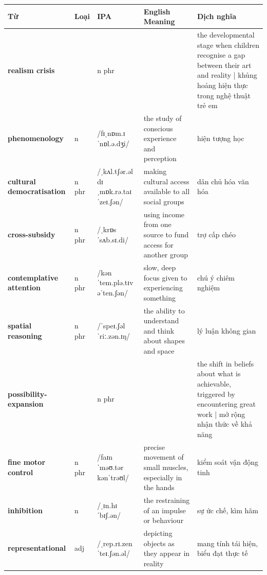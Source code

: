 \separator


\vspace{0.8em}
\begin{center}
\renewcommand{\arraystretch}{1.65}
\begin{tabularx}{\textwidth}{|V{0.22\textwidth}|C{0.07\textwidth}|I{0.20\textwidth}|Y|V{0.18\textwidth}|}
\hline
{}
\textbf{Từ} & \textbf{Loại} & \textbf{IPA} & \textbf{English Meaning} & \textbf{Dịch nghĩa} \\
\hline
\textbf{realism crisis} & & n phr & & the developmental stage when children recognise a gap between their art and reality | khủng hoảng hiện thực trong nghệ thuật trẻ em \\ \hline
\textbf{phenomenology} & n & /fɪˌnɒm.ɪˈnɒl.ə.dʒi/ & the study of conscious experience and perception & hiện tượng học \\ \hline
\textbf{cultural democratisation} & n phr & /ˌkʌl.tʃər.əl dɪˌmɒk.rə.taɪˈzeɪ.ʃən/ & making cultural access available to all social groups & dân chủ hóa văn hóa \\ \hline
\textbf{cross-subsidy} & n phr & /ˌkrɒs ˈsʌb.sɪ.di/ & using income from one source to fund access for another group & trợ cấp chéo \\ \hline
\textbf{contemplative attention} & n phr & /kənˈtem.plə.tɪv əˈten.ʃən/ & slow, deep focus given to experiencing something & chú ý chiêm nghiệm \\ \hline
\textbf{spatial reasoning} & n phr & /ˈspeɪ.ʃəl ˈriː.zən.ɪŋ/ & the ability to understand and think about shapes and space & lý luận không gian \\ \hline
\textbf{possibility-expansion} & & n phr & & the shift in beliefs about what is achievable, triggered by encountering great work | mở rộng nhận thức về khả năng \\ \hline
\textbf{fine motor control} & n phr & /faɪn ˈməʊ.tər kənˈtrəʊl/ & precise movement of small muscles, especially in the hands & kiểm soát vận động tinh \\ \hline
\textbf{inhibition} & n & /ˌɪn.hɪˈbɪʃ.ən/ & the restraining of an impulse or behaviour & sự ức chế, kìm hãm \\ \hline
\textbf{representational} & adj & /ˌrep.rɪ.zenˈteɪ.ʃən.əl/ & depicting objects as they appear in reality & mang tính tái hiện, biểu đạt thực tế \\ \hline
\end{tabularx}
\end{center}

